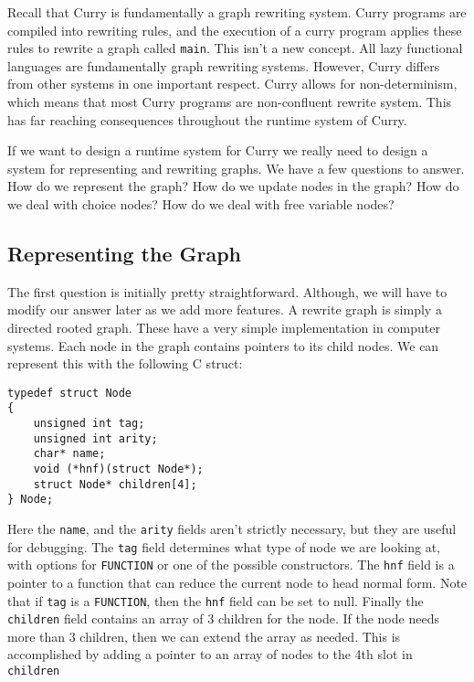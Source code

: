 \documentclass{article}
\begin{document}
Recall that Curry is fundamentally a graph rewriting system.
Curry programs are compiled into rewriting rules,
and the execution of a curry program applies these rules to rewrite a graph called \texttt{main}.
This isn't a new concept.  All lazy functional languages are fundamentally graph rewriting systems.
However, Curry differs from other systems in one important respect.
Curry allows for non-determinism, which means that most Curry programs are non-confluent rewrite system.
This has far reaching consequences throughout the runtime system of Curry.

If we want to design a runtime system for Curry we really need to design a system for
representing and rewriting graphs.
We have a few questions to answer.
How do we represent the graph?
How do we update nodes in the graph?
How do we deal with choice nodes?
How do we deal with free variable nodes?

\subsection{Representing the Graph}

The first question is initially pretty straightforward.
Although, we will have to modify our answer later as we add more features.
A rewrite graph is simply a directed rooted graph.
These have a very simple implementation in computer systems.
Each node in the graph contains pointers to its child nodes.
We can represent this with the following C struct:

\begin{verbatim}
typedef struct Node
{
    unsigned int tag;
    unsigned int arity;
    char* name;
    void (*hnf)(struct Node*);
    struct Node* children[4];
} Node;
\end{verbatim}

Here the \texttt{name}, and the \texttt{arity} fields aren't strictly necessary,
but they are useful for debugging.
The \texttt{tag} field determines what type of node we are looking at,
with options for \texttt{FUNCTION} or one of the possible constructors.
The \texttt{hnf} field is a pointer to a function that can reduce the current node to head normal form.
Note that if \texttt{tag} is a \texttt{FUNCTION}, then the \texttt{hnf} field can be set to null.
Finally the \texttt{children} field contains an array of 3 children for the node.
If the node needs more than 3 children, then we can extend the array as needed.
This is accomplished by adding a pointer to an array of nodes to the 4th slot in \texttt{children}
\end{document}
